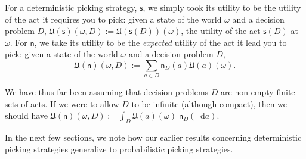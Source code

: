 \documentclass[a4paper]{article}
\newcommand\Exp{\mathsf{Exp}}
\newcommand\EU{\mathrm{EU}}
\newcommand\U{\mathfrak{U}} %
\newcommand\s{\mathsf{s}}
\newcommand{\n}{\mathsf{n}}
\newcommand{\todoold}[2][]{\todo[backgroundcolor=white,bordercolor=orange!10,linecolor=gray!10, #1,caption={},textcolor=gray]{Pre-rev: #2}}
\newcommand{\todooldinfo}[2][]{\todoold[#1]{#2}}
\renewcommand{\color}[1]{}
\newenvironment{colored}[1]{\leavevmode\color{#1}}{}
\newcommand*\diff{\mathop{}\!\mathrm{d}}
\newenvironment{CCM rewritten}
{\begingroup\color{blue}} %
{\endgroup}              %
\begin{document}
For a deterministic picking strategy, $\s$, we simply took its utility to be the utility of the act it requires you to pick: given a state of the world $\omega$ and a decision problem $D$, $\U(\s)(\omega,D):=\U(\s(D))(\omega)$, the utility of the act $\s(D)$ at $\omega$. For $\n$, we take its utility to be the \emph{expected} utility of the act it lead you to pick: given a state of the world $\omega$ and a decision problem $D$, $$\U(\n)(\omega,D):=\sum_{a \in D} \n_D(a)\U(a)(\omega).$$
\begin{comment}
\begin{colored}{violet}
	If we are allowing $D$ to be infinite (although compact), we should in fact take an integral, $\U(\n)(\omega,D):=\int_{a \in D} \U(a)(\omega)\,\n_D(\diff a).$\todoold{should we explicitly talk about finitely additive integrals?}
\end{colored}
\end{comment}


We have thus far been assuming that decision problems $D$ are non-empty finite sets of acts. If we were to allow $D$ to be infinite (although compact), then we should have $\U(\n)(\omega,D):=\int_{D} \U(a)(\omega)\; \n_D(\diff a)$.

In the next few sections, we note how our earlier results concerning deterministic
picking strategies generalize to probabilistic picking strategies.
\end{document}
